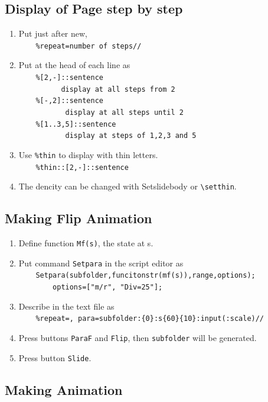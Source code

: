 \documentclass[papersize,a4paper,12pt]{article}
\begin{document}
\subsection{Display of Page step by step}

\begin{enumerate}[1)]
\item Put just after new,\\
\verb|    %repeat=number of steps//|
\item Put at the head of each line as\\
\verb|    %[2,-]::sentence|\\
\verb|          display at all steps from 2|\\
\verb|    %[-,2]::sentence|\\
\verb|           display at all steps until 2|\\
\verb|    %[1..3,5]::sentence|\\
\verb|           display at steps of 1,2,3 and 5|
\item  Use \verb|%thin| to display with thin letters.\\
\verb|    %thin::[2,-]::sentence|
\item The dencity can be changed with Setslidebody or \verb|\setthin|.
\end{enumerate}

\subsection{Making Flip Animation}

\begin{enumerate}[1)]
\item Define function \verb|Mf(s)|, the state at s.
\item Put command \verb|Setpara| in the script editor as\\ 
\verb|    Setpara(subfolder,funcitonstr(mf(s)),range,options);|\\
\verb|        options=["m/r", "Div=25"];|
\item Describe in the text file as\\
\verb|    %repeat=, para=subfolder:{0}:s{60}{10}:input(:scale)//|
\item Press buttons \verb|ParaF| and \verb|Flip|, then \verb|subfolder| will be generated.
\item Press button \verb|Slide|.
\end{enumerate}

\subsection{Making Animation}
\end{document}
